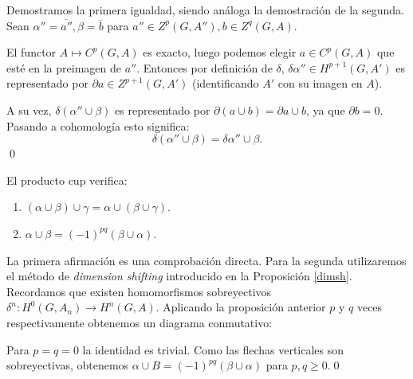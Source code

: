 \documentclass[a4paper,12pt, leqno]{article}
\begin{document}
\begin{dem}
	Demostramos la primera igualdad, siendo análoga la demostración de la segunda. Sean $\alpha''=\overline{a''},\beta=\overline{b}$ para $a''\in Z^p(G,A''),b\in Z^q(G,A)$. 
	
	El functor $A \mapsto C^p(G,A)$ es exacto, luego podemos elegir $a\in C^p(G,A)$ que esté en la preimagen de $a''$.	Entonces por definición de $\delta$, $\delta \alpha''\in H^{p+1}(G,A')$ es representado por $\partial a\in Z^{p+1}(G,A')$  (identificando $A'$ con su imagen en $A$).
	
	A su vez, $\delta(\alpha'' \cup \beta)$ es representado por $\partial(a \cup b)=\partial a \cup b$, ya que $\partial b = 0$. Pasando a cohomología esto significa:
	\begin{equation*}
	\delta(\alpha'' \cup \beta)=\delta \alpha'' \cup \beta.
	\end{equation*}\qed
\end{dem}
\begin{prop}
	El producto cup verifica:
	
	\begin{enumerate}[label = \roman*)]
		\item $(\alpha \cup \beta) \cup \gamma = \alpha \cup (\beta \cup \gamma)$.
		\item $\alpha \cup \beta = (-1)^{pq}(\beta \cup \alpha)$.
	\end{enumerate}
\end{prop}
\begin{dem}
	La primera afirmación es una comprobación directa. Para la segunda utilizaremos el método de \textit{dimension shifting} introducido en la Proposición \ref{dimsh}. Recordamos que existen homomorfismos sobreyectivos $\delta^n: H^0(G,A_n)\rightarrow H^n(G,A).$ Aplicando la proposición anterior $p$ y $q$ veces respectivamente obtenemos un diagrama conmutativo:
	\begin{center}
\end{center}
Para $p=q=0$ la identidad es trivial. Como las flechas verticales son sobreyectivas, obtenemos $\alpha \cup B=(-1)^{pq}(\beta \cup \alpha)$ para $p,q \geq 0$.\qed
\end{dem}
\end{document}
